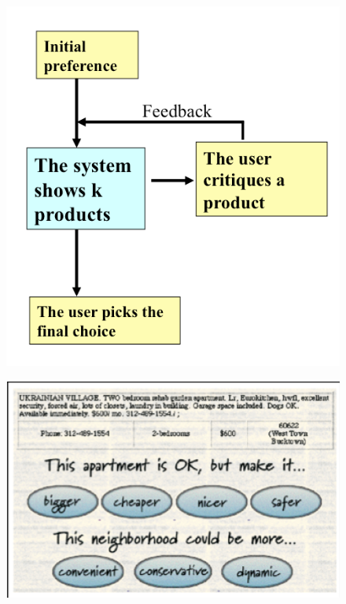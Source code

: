 \begin{figure}
\centering
\begin{minipage}{.5\textwidth}
  \centering
  \includegraphics[width=1\linewidth]{figures-bharath/critiquing.png}
  \label{fig:test1}
\end{minipage}%
\begin{minipage}{.5\textwidth}
  \centering
  \includegraphics[width=1\linewidth]{figures-bharath/rentMe.png}
  \label{fig:rentMe}
\end{minipage}
\end{figure}
